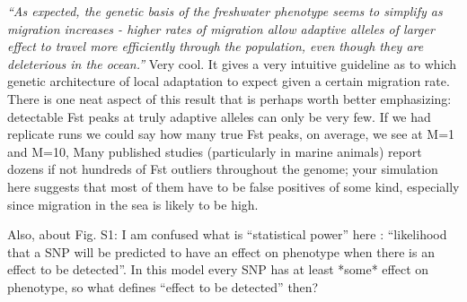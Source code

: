 \begin{point}{\revref}
    \textit{``As expected, the genetic basis of the freshwater phenotype seems to simplify
    as migration increases - higher rates of migration allow adaptive alleles of
    larger effect to travel more efficiently through the population, even though
    they are deleterious in the ocean.''}
    Very cool. It gives a very intuitive guideline as to which genetic
    architecture of local adaptation to expect given a certain migration rate.
    There is one neat aspect of this result that is perhaps worth better
    emphasizing: detectable Fst peaks at truly adaptive
    alleles can only be very few. If we had replicate runs we could say how many
    true Fst peaks, on average, we see at M=1 and M=10, Many published studies
    (particularly in marine animals) report dozens if not hundreds of Fst outliers
    throughout the genome; your simulation here suggests that most of them have to
    be false positives of some kind, especially since migration in the sea is
    likely to be high.
\end{point}



\begin{point}{}
Also, about Fig. S1: I am confused what is ``statistical power'' here :
``likelihood that a SNP will be predicted to have an effect on phenotype when
there is an effect to be detected''. In this model every SNP has at least *some*
effect on phenotype, so what defines ``effect to be detected'' then?
\end{point}


